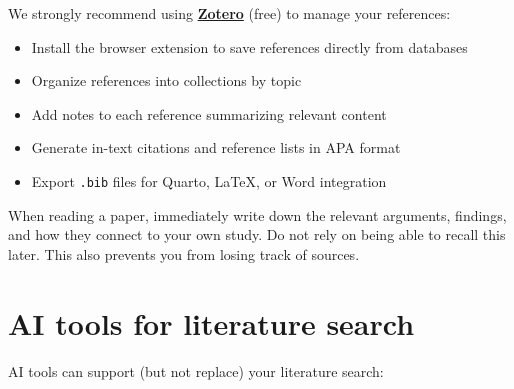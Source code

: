 \documentclass[
  11pt,
  a4paper,
]{scrbook}
\providecommand{\tightlist}{%
  \setlength{\itemsep}{0pt}\setlength{\parskip}{0pt}}\usepackage{longtable,booktabs,array}
\begin{document}
We strongly recommend using
\textbf{\href{https://www.zotero.org}{Zotero}} (free) to manage your
references:

\begin{itemize}
\tightlist
\item
  Install the browser extension to save references directly from
  databases
\item
  Organize references into collections by topic
\item
  Add notes to each reference summarizing relevant content
\item
  Generate in-text citations and reference lists in APA format
\item
  Export \texttt{.bib} files for Quarto, LaTeX, or Word integration
\end{itemize}

\begin{tcolorbox}[enhanced jigsaw, bottomrule=.15mm, opacityback=0, toprule=.15mm, colframe=quarto-callout-tip-color-frame, left=2mm, rightrule=.15mm, title=\textcolor{quarto-callout-tip-color}{\faLightbulb}\hspace{0.5em}{Write as you read}, colbacktitle=quarto-callout-tip-color!10!white, bottomtitle=1mm, colback=white, breakable, toptitle=1mm, titlerule=0mm, leftrule=.75mm, arc=.35mm, opacitybacktitle=0.6, coltitle=black]

When reading a paper, immediately write down the relevant arguments,
findings, and how they connect to your own study. Do not rely on being
able to recall this later. This also prevents you from losing track of
sources.

\end{tcolorbox}

\section{AI tools for literature
search}\label{ai-tools-for-literature-search}

AI tools can support (but not replace) your literature search:
\end{document}
